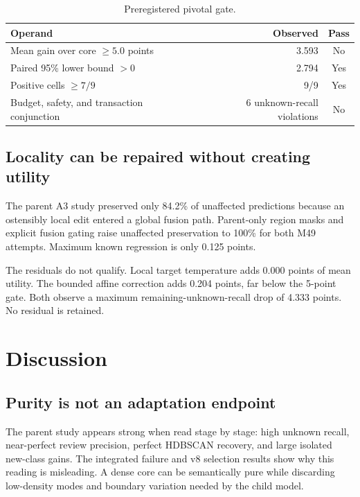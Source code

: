 \documentclass[10pt]{article}
\begin{document}
\begin{table}[t]
\centering
\caption{Preregistered pivotal gate.}
\label{tab:gate}
\begin{tabular}{lrc}
\toprule
Operand & Observed & Pass \\
\midrule
Mean gain over core $\geq 5.0$ points & 3.593 & No \\
Paired 95\% lower bound $>0$ & 2.794 & Yes \\
Positive cells $\geq 7/9$ & 9/9 & Yes \\
Budget, safety, and transaction conjunction & 6 unknown-recall violations & No \\
\bottomrule
\end{tabular}
\end{table}

\subsection{Locality can be repaired without creating utility}

The parent A3 study preserved only 84.2\% of unaffected predictions because
an ostensibly local edit entered a global fusion path. Parent-only region masks
and explicit fusion gating raise unaffected preservation to 100\% for both M49
attempts. Maximum known regression is only 0.125 points.

The residuals do not qualify. Local target temperature adds 0.000 points of
mean utility. The bounded affine correction adds 0.204 points, far below the
5-point gate. Both observe a maximum remaining-unknown-recall drop of 4.333
points. No residual is retained.

\section{Discussion}

\subsection{Purity is not an adaptation endpoint}

The parent study appears strong when read stage by stage: high unknown recall,
near-perfect review precision, perfect HDBSCAN recovery, and large isolated
new-class gains. The integrated failure and v8 selection results show why this
reading is misleading. A dense core can be semantically pure while discarding
low-density modes and boundary variation needed by the child model.
\end{document}
